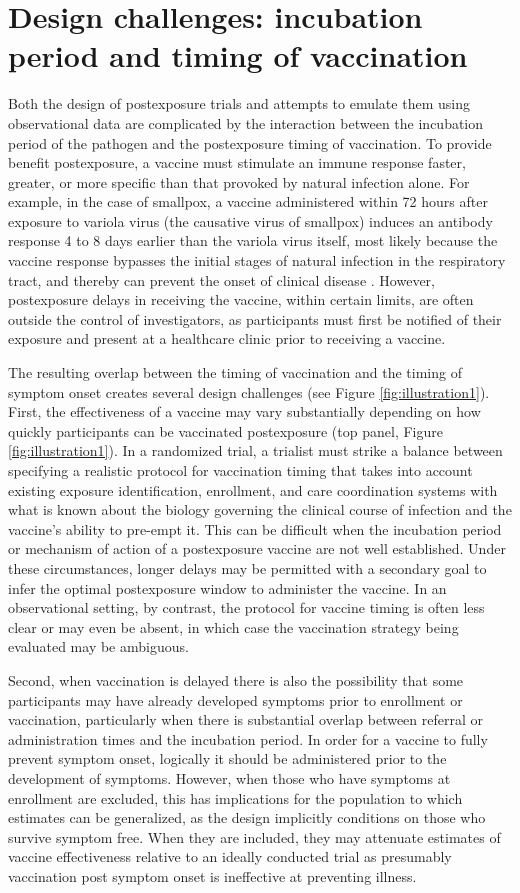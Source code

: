 \documentclass[11pt]{article}
\begin{document}
\section{Design challenges: incubation period and timing of vaccination}
Both the design of postexposure trials and attempts to emulate them using observational data are complicated by the interaction between the incubation period of the pathogen and the postexposure timing of vaccination. To provide benefit postexposure, a vaccine must stimulate an immune response faster, greater, or more specific than that provoked by natural infection alone. For example, in the case of smallpox, a vaccine administered within 72 hours after exposure to variola virus (the causative virus of smallpox) induces an antibody response 4 to 8 days earlier than the variola virus itself, most likely because the vaccine response bypasses the initial stages of natural infection in the respiratory tract, and thereby can prevent the onset of clinical disease \cite{massoudi_effectiveness_2003,keckler_effects_2013}. However, postexposure delays in receiving the vaccine, within certain limits, are often outside the control of investigators, as participants must first be notified of their exposure and present at a healthcare clinic prior to receiving a vaccine. 

The resulting overlap between the timing of vaccination and the timing of symptom onset creates several design challenges (see Figure \ref{fig:illustration1}). First, the effectiveness of a vaccine may vary substantially depending on how quickly participants can be vaccinated postexposure (top panel, Figure \ref{fig:illustration1}). In a randomized trial, a trialist must strike a balance between specifying a realistic protocol for vaccination timing that takes into account existing exposure identification, enrollment, and care coordination systems with what is known about the biology governing the clinical course of infection and the vaccine's ability to pre-empt it. This can be difficult when the incubation period or mechanism of action of a postexposure vaccine are not well established. Under these circumstances, longer delays may be permitted with a secondary goal to infer the optimal postexposure window to administer the vaccine. In an observational setting, by contrast, the protocol for vaccine timing is often less clear or may even be absent, in which case the vaccination strategy being evaluated may be ambiguous.

Second, when vaccination is delayed there is also the possibility that some participants may have already developed symptoms prior to enrollment or vaccination, particularly when there is substantial overlap between referral or administration times and the incubation period. In order for a vaccine to fully prevent symptom onset, logically it should be administered prior to the development of symptoms. However, when those who have symptoms at enrollment are excluded, this has implications for the population to which estimates can be generalized, as the design implicitly conditions on those who survive symptom free. When they are included, they may attenuate estimates of vaccine effectiveness relative to an ideally conducted trial as presumably vaccination post symptom onset is ineffective at preventing illness. 
\end{document}
